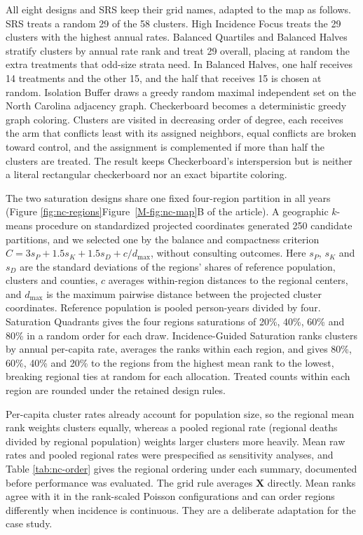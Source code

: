 \documentclass[11pt]{article}
\begin{document}
All eight designs and SRS keep their grid names, adapted to the map as
follows. SRS treats a random 29 of the 58 clusters. High Incidence Focus
treats the 29 clusters with the highest annual rates. Balanced Quartiles
and Balanced Halves stratify clusters by annual rate rank and treat 29
overall, placing at random the extra treatments that odd-size strata
need. In Balanced Halves, one half receives 14 treatments and the other
15, and the half that receives 15 is chosen at random. Isolation Buffer
draws a greedy random maximal independent set on the North Carolina adjacency graph.
Checkerboard becomes a deterministic greedy graph coloring. Clusters are
visited in decreasing order of degree, each receives the arm that
conflicts least with its assigned neighbors, equal conflicts are broken
toward control, and the assignment is complemented if more than half the
clusters are treated. The result keeps Checkerboard's interspersion but
is neither a literal rectangular checkerboard nor an exact bipartite
coloring.

The two saturation designs share one fixed four-region partition in all
years (\iffullsi Figure \ref{fig:nc-regions}\else Figure~\ref{M-fig:nc-map}B of the article\fi). A geographic $k$-means procedure on
standardized projected coordinates generated 250 candidate partitions,
and we selected one by the balance and compactness criterion
\(C=3s_P+1.5s_K+1.5s_D+c/d_{\max}\), without consulting outcomes. Here
\(s_P\), \(s_K\) and \(s_D\) are the standard deviations of the regions'
shares of reference population, clusters and counties, \(c\) averages
within-region distances to the regional centers, and \(d_{\max}\) is the
maximum pairwise distance between the projected cluster coordinates.
Reference population is pooled person-years divided by four. Saturation
Quadrants gives the four regions saturations of 20\%, 40\%, 60\% and
80\% in a random order for each draw. Incidence-Guided Saturation ranks
clusters by annual per-capita rate, averages the ranks within each
region, and gives 80\%, 60\%, 40\% and 20\% to the regions from the
highest mean rank to the lowest, breaking regional ties at random for
each allocation. Treated counts within each region are rounded under the
retained design rules.

Per-capita cluster rates already account for population size, so the
regional mean rank weights clusters equally, whereas a pooled regional
rate (regional deaths divided by regional population) weights larger
clusters more heavily. Mean raw rates and pooled regional rates were prespecified as sensitivity analyses, and Table \ref{tab:nc-order} gives the regional ordering under each
summary, documented before performance was evaluated. The grid rule
averages \(\mathbf{X}\) directly. Mean ranks agree with it in the rank-scaled Poisson configurations and can order regions differently when incidence is continuous. They are a deliberate adaptation for the case study.
\end{document}
